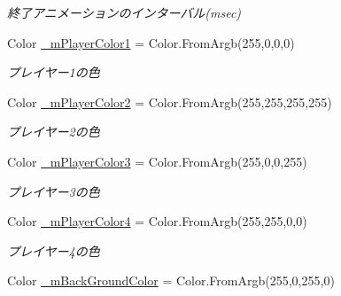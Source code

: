 \begin{DoxyCompactItemize}
\begin{DoxyCompactList}\small\item\em 終了アニメーションのインターバル(msec) \end{DoxyCompactList}\item 
Color \hyperlink{class_reversi4color_wpf_1_1_reversi_setting_ab939e1084da7af7ae0db833db4be1ecd}{\+\_\+m\+Player\+Color1} = Color.\+From\+Argb(255,0,0,0)\hypertarget{class_reversi4color_wpf_1_1_reversi_setting_ab939e1084da7af7ae0db833db4be1ecd}{}\label{class_reversi4color_wpf_1_1_reversi_setting_ab939e1084da7af7ae0db833db4be1ecd}

\begin{DoxyCompactList}\small\item\em プレイヤー1の色 \end{DoxyCompactList}\item 
Color \hyperlink{class_reversi4color_wpf_1_1_reversi_setting_ab56048d4d5e06451d7ae735c60fa3a64}{\+\_\+m\+Player\+Color2} = Color.\+From\+Argb(255,255,255,255)\hypertarget{class_reversi4color_wpf_1_1_reversi_setting_ab56048d4d5e06451d7ae735c60fa3a64}{}\label{class_reversi4color_wpf_1_1_reversi_setting_ab56048d4d5e06451d7ae735c60fa3a64}

\begin{DoxyCompactList}\small\item\em プレイヤー2の色 \end{DoxyCompactList}\item 
Color \hyperlink{class_reversi4color_wpf_1_1_reversi_setting_a1a6d1a59cbcd4193c86e83ca8e6e05e6}{\+\_\+m\+Player\+Color3} = Color.\+From\+Argb(255,0,0,255)\hypertarget{class_reversi4color_wpf_1_1_reversi_setting_a1a6d1a59cbcd4193c86e83ca8e6e05e6}{}\label{class_reversi4color_wpf_1_1_reversi_setting_a1a6d1a59cbcd4193c86e83ca8e6e05e6}

\begin{DoxyCompactList}\small\item\em プレイヤー3の色 \end{DoxyCompactList}\item 
Color \hyperlink{class_reversi4color_wpf_1_1_reversi_setting_a096df8f77572a4acbe165a87d61cd5a9}{\+\_\+m\+Player\+Color4} = Color.\+From\+Argb(255,255,0,0)\hypertarget{class_reversi4color_wpf_1_1_reversi_setting_a096df8f77572a4acbe165a87d61cd5a9}{}\label{class_reversi4color_wpf_1_1_reversi_setting_a096df8f77572a4acbe165a87d61cd5a9}

\begin{DoxyCompactList}\small\item\em プレイヤー4の色 \end{DoxyCompactList}\item 
Color \hyperlink{class_reversi4color_wpf_1_1_reversi_setting_a98f04cb8228e776c7fb1dc12b1c504e0}{\+\_\+m\+Back\+Ground\+Color} = Color.\+From\+Argb(255,0,255,0)\hypertarget{class_reversi4color_wpf_1_1_reversi_setting_a98f04cb8228e776c7fb1dc12b1c504e0}{}\label{class_reversi4color_wpf_1_1_reversi_setting_a98f04cb8228e776c7fb1dc12b1c504e0}


\end{DoxyCompactItemize}
